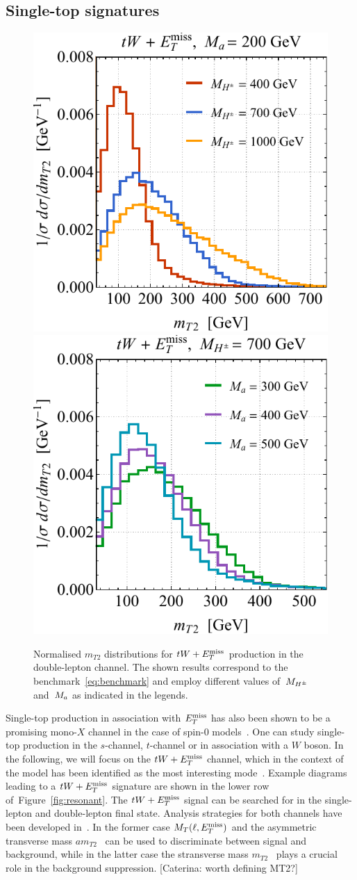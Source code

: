 \subsection*{Single-top signatures}

\begin{figure}[t!]
\centering
\includegraphics[height=0.45\textwidth]{texinputs/04_grid/newfigures/mt2l.pdf} \qquad 
\includegraphics[height=0.45\textwidth]{texinputs/04_grid/newfigures/mt2r.pdf}
\vspace{2mm}
\caption{\label{fig:mt2spectra} Normalised $m_{T2}$ distributions for $tW+E_T^\mathrm{miss}$ production in the double-lepton channel.  The shown results correspond to the \hdma benchmark~\eqref{eq:benchmark} and employ different values of~$M_{H^{\pm}}$ and~$M_{a}$ as indicated in the legends.}
\end{figure}

Single-top production in association with $E_T^\mathrm{miss}$ has also been shown to be a promising mono-$X$ channel in the case of spin-0 models~\cite{Pinna:2017tay,Pani:2017qyd,Plehn:2017bys}. One can study single-top production in the $s$-channel, $t$-channel  or  in association with a $W$ boson. In the following, we will focus on the $tW + E_T^\mathrm{miss}$ channel, which in the context of the \hdma model has been identified as the most interesting mode~\cite{Pani:2017qyd}. Example diagrams leading to a $tW + E_T^\mathrm{miss}$ signature are shown in the lower row of~Figure~\ref{fig:resonant}. The $tW + E_T^\mathrm{miss}$ signal can be searched for in the single-lepton and double-lepton final state. Analysis strategies for both channels have been developed in~\cite{Pani:2017qyd}. In the former case $M_T (\ell, E_T^\mathrm{miss})$ and the asymmetric transverse mass $am_{T2}$~\cite{Konar:2009qr,Lester:2014yga} can be used to discriminate between signal and background, while in the latter case the stransverse mass $m_{T2}$~\cite{Lester:1999tx,Barr:2003rg} plays a crucial role in the background suppression. \color{red}[Caterina: worth defining MT2?]\color{black}


